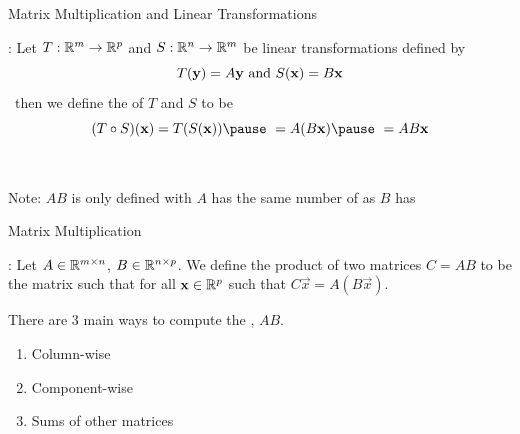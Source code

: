 \documentclass[xcoler=dvipsnames, aspectratio=169]{beamer}
\begin{document}
    \begin{frame}{Matrix Multiplication and Linear Transformations}
        \small
        \begin{defn} :
            Let $T:\R^m\rightarrow\R^p$ and $S:\R^n\rightarrow\R^m$ be linear transformations defined
            by 
            \[
                T(\vec{y}) = A\vec{y}\textnormal{ and } S(\vec{x}) = B\vec{x}
            \]\pause\ 
            then we define the  of $T$ and $S$ to be
            \[
                (T\circ S)(\vec{x}) = T(S(\vec{x})) \pause\ = A(B\vec{x}) \pause\ = AB\vec{x}
            \]
        \end{defn}\pause\ 
        \begin{tcolorbox}
            Note: $AB$ is only defined with $A$ has the same number of  as $B$ has 
        \end{tcolorbox}
    \end{frame}
    \begin{frame}{Matrix Multiplication}
        \begin{defn}
            : Let $A\in\R^{m\times n}$, $B\in\R^{n\times p}$. 
            We define the product of two matrices $C=AB$ to be the matrix such that for all
            $\vec{x}\in\R^{p}$ such that $C\vec{x} = A(B\vec{x})$.
        \end{defn}
        \pause
        There are $3$ main ways to compute the , $AB$.\pause
        \begin{enumerate}
            \item Column-wise\pause
            \item Component-wise\pause
            \item Sums of other matrices
        \end{enumerate}
    \end{frame}
\end{document}
